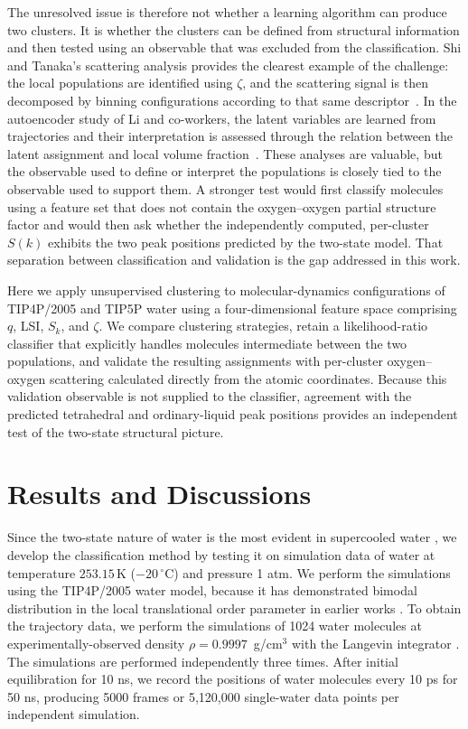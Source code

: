 \documentclass[aps, amsmath,amssymb, reprint, twocolumn, superscriptaddress]{revtex4-2}
\begin{document}
The unresolved issue is therefore not whether a learning algorithm can produce
two clusters. It is whether the clusters can be defined from structural
information and then tested using an observable that was excluded from the
classification. Shi and Tanaka's scattering analysis provides the clearest
example of the challenge: the local populations are identified using $\zeta$,
and the scattering signal is then decomposed by binning configurations according
to that same descriptor~\cite{shi_direct_2020}. In the autoencoder study of Li
and co-workers, the latent variables are learned from trajectories and their
interpretation is assessed through the relation between the latent assignment
and local volume fraction~\cite{li_evidence_2026}. These analyses are valuable,
but the observable used to define or interpret the populations is closely tied
to the observable used to support them. A stronger test would first classify
molecules using a feature set that does not contain the oxygen--oxygen partial
structure factor and would then ask whether the independently computed,
per-cluster $S(k)$ exhibits the two peak positions predicted by the two-state
model. That separation between classification and validation is the gap
addressed in this work.

Here we apply unsupervised clustering to molecular-dynamics configurations of
TIP4P/2005 and TIP5P water using a four-dimensional feature space comprising
$q$, LSI, $S_k$, and $\zeta$. We compare clustering strategies, retain a
likelihood-ratio classifier that explicitly handles molecules intermediate
between the two populations, and validate the resulting assignments with
per-cluster oxygen--oxygen scattering calculated directly from the atomic
coordinates. Because this validation observable is not supplied to the
classifier, agreement with the predicted tetrahedral and ordinary-liquid peak
positions provides an independent test of the two-state structural picture.

\section{Results and Discussions}
Since the two-state nature of water is the most evident in supercooled water \cite{russo_understanding_2014}, we develop the classification method by testing it on simulation data of water at temperature $253.15\,\mathrm{K}$ ($-20\,^\circ$C) and pressure 1 atm. We perform the simulations using the TIP4P/2005 water model, because it has demonstrated bimodal distribution in the local translational order parameter in earlier works \cite{russo_understanding_2014}. To obtain the trajectory data, we perform the simulations of 1024 water molecules at experimentally-observed density $\rho = 0.9997$~g/cm$^3$ with the Langevin integrator \cite{Izaguirre2010}. The simulations are performed independently three times. After initial equilibration for 10 ns, we record the positions of water molecules every 10 ps for 50 ns, producing 5000 frames or 5,120,000 single-water data points per independent simulation. 
\end{document}
